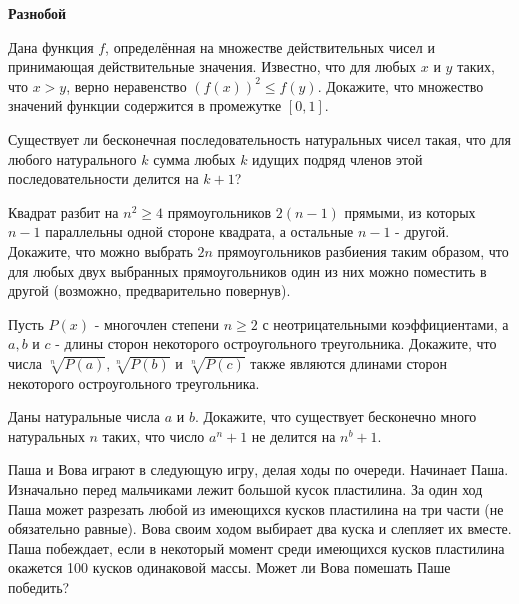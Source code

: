 \centerline{\bf \Huge Разнобой}


Дана функция $f$, определённая на множестве действительных чисел и принимающая действительные значения. Известно, что для любых $x$ и $y$ таких, что $x>y$, верно неравенство $(f(x))^2 \leqslant f(y)$. Докажите, что множество значений функции содержится в промежутке $[0,1]$.

Существует ли бесконечная последовательность натуральных чисел такая, что для любого натурального $k$ сумма любых $k$ идущих подряд членов этой последовательности делится на $k+1$?

Квадрат разбит на $n^2 \geqslant 4$ прямоугольников $2(n-1)$ прямыми, из которых $n-1$ параллельны одной стороне квадрата, а остальные $n-1$ - другой. Докажите, что можно выбрать $2 n$ прямоугольников разбиения таким образом, что для любых двух выбранных прямоугольников один из них можно поместить в другой (возможно, предварительно повернув).

Пусть $P(x)$ - многочлен степени $n \geqslant 2$ с неотрицательными коэффициентами, а $a, b$ и $c$ - длины сторон некоторого остроугольного треугольника. Докажите, что числа $\sqrt[n]{P(a)}, \sqrt[n]{P(b)}$ и $\sqrt[n]{P(c)}$ также являются длинами сторон некоторого остроугольного треугольника.

Даны натуральные числа $a$ и $b$. Докажите, что существует бесконечно много натуральных $n$ таких, что число $a^n+1$ не делится на $n^b+1$.

Паша и Вова играют в следующую игру, делая ходы по очереди. Начинает Паша. Изначально перед мальчиками лежит большой кусок пластилина. За один ход Паша может разрезать любой из имеющихся кусков пластилина на три части (не обязательно равные). Вова своим ходом выбирает два куска и слепляет их вместе. Паша побеждает, если в некоторый момент среди имеющихся кусков пластилина окажется 100 кусков одинаковой массы. Может ли Вова помешать Паше победить?